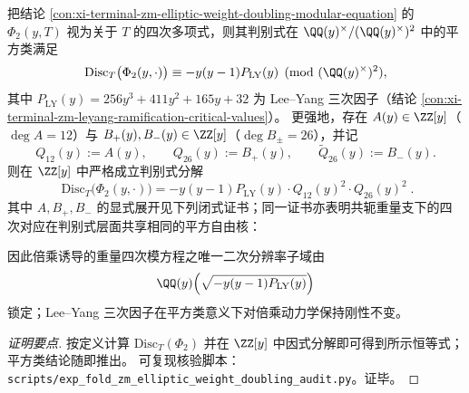 \begin{conclusion}\label{con:xi-terminal-zm-elliptic-weight-doubling-disc-squareclass}
把结论 \ref{con:xi-terminal-zm-elliptic-weight-doubling-modular-equation} 的 \(\Phi_{2}(y,T)\) 视为关于 \(T\) 的四次多项式，则其判别式在 \(\QQ(y)^{\times}/(\QQ(y)^{\times})^{2}\) 中的平方类满足
\[
\mathrm{Disc}_{T}\bigl(\Phi_{2}(y,\cdot)\bigr)\equiv -y(y-1)P_{\mathrm{LY}}(y)\pmod{(\QQ(y)^{\times})^{2}},
\]
其中 \(P_{\mathrm{LY}}(y)=256y^{3}+411y^{2}+165y+32\) 为 Lee--Yang 三次因子（结论 \ref{con:xi-terminal-zm-leyang-ramification-critical-values}）。
更强地，存在 \(A(y)\in\ZZ[y]\)（\(\deg A=12\)）与 \(B_{+}(y),B_{-}(y)\in\ZZ[y]\)（\(\deg B_{\pm}=26\)），并记
\[
Q_{12}(y):=A(y),
\qquad
Q_{26}(y):=B_{+}(y),
\qquad
\widetilde Q_{26}(y):=B_{-}(y).
\]
则在 \(\ZZ[y]\) 中严格成立判别式分解
\[
\boxed{\;
\mathrm{Disc}_{T}\bigl(\Phi_{2}(y,\cdot)\bigr)=-y(y-1)P_{\mathrm{LY}}(y)\cdot Q_{12}(y)^{2}\cdot Q_{26}(y)^{2}\; }.
\]
其中 \(A,B_{+},B_{-}\) 的显式展开见下列闭式证书；同一证书亦表明共轭重量支下的四次对应在判别式层面共享相同的平方自由核：

因此倍乘诱导的重量四次模方程之唯一二次分辨率子域由
\[
\QQ(y)\Bigl(\sqrt{-y(y-1)P_{\mathrm{LY}}(y)}\Bigr)
\]
锁定；Lee--Yang 三次因子在平方类意义下对倍乘动力学保持刚性不变。
\end{conclusion}
\begin{proof}[证明要点]
按定义计算 \(\mathrm{Disc}_{T}(\Phi_2)\) 并在 \(\ZZ[y]\) 中因式分解即可得到所示恒等式；平方类结论随即推出。
可复现核验脚本：\texttt{scripts/exp\_fold\_zm\_elliptic\_weight\_doubling\_audit.py}。证毕。
\end{proof}


